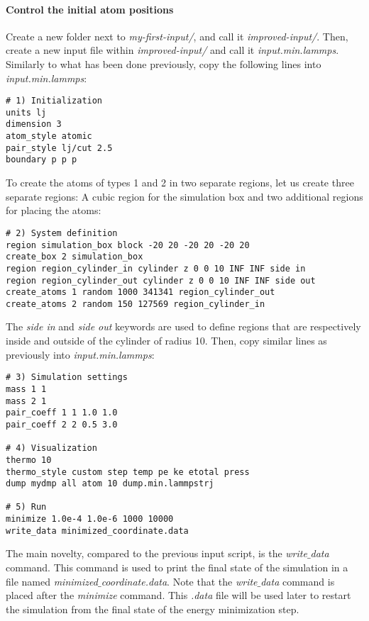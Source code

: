 \paragraph{Control the initial atom positions}
\noindent Create a new folder next to \textit{my-first-input/}, and call it \textit{improved-input/}. Then, create a new input file within \textit{improved-input/} and call it \textit{input.min.lammps}. Similarly to what has been done previously, copy the following lines into \textit{input.min.lammps}:
\begin{verbatim}
# 1) Initialization
units lj
dimension 3
atom_style atomic
pair_style lj/cut 2.5
boundary p p p
\end{verbatim}
To create the atoms of types 1 and 2 in two separate regions, let us create three separate regions: A cubic region for the simulation box and two additional regions for placing the atoms:
\begin{verbatim}
# 2) System definition
region simulation_box block -20 20 -20 20 -20 20
create_box 2 simulation_box
region region_cylinder_in cylinder z 0 0 10 INF INF side in
region region_cylinder_out cylinder z 0 0 10 INF INF side out
create_atoms 1 random 1000 341341 region_cylinder_out
create_atoms 2 random 150 127569 region_cylinder_in
\end{verbatim}
The \textit{side in} and \textit{side out} keywords are used to define regions that are respectively inside and outside of the cylinder of radius 10. Then, copy similar lines as previously into \textit{input.min.lammps}:
\begin{verbatim}
# 3) Simulation settings
mass 1 1
mass 2 1
pair_coeff 1 1 1.0 1.0
pair_coeff 2 2 0.5 3.0

# 4) Visualization
thermo 10
thermo_style custom step temp pe ke etotal press
dump mydmp all atom 10 dump.min.lammpstrj

# 5) Run
minimize 1.0e-4 1.0e-6 1000 10000
write_data minimized_coordinate.data
\end{verbatim}
The main novelty, compared to the previous input script, is the \textit{write$\_$data} command. This command is used to print the final state of the simulation in a file named \textit{minimized$\_$coordinate.data}. Note that the \textit{write$\_$data} command is placed after the \textit{minimize} command. This \textit{.data} file will be used later to restart the simulation from the final state of the energy minimization step.

